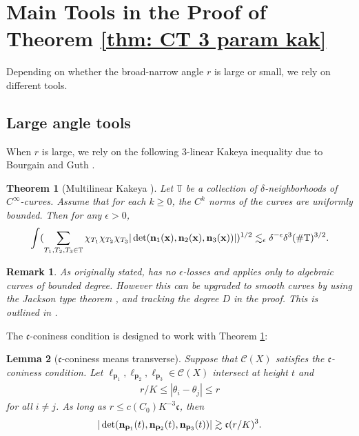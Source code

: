 \documentclass[12pt]{amsart}
\newcommand{\x}{{\bf{x}}}
\numberwithin{equation}{section}
\newtheorem{theorem}{Theorem}
\newtheorem{lemma}{Lemma}[section]
\newtheorem{remark}[lemma]{Remark}
\newcommand{\bn}{\mathbf{n}}
\renewcommand{\bn}{{\bf n}}
\newcommand{\1}{\mathbbm{1}}
\newcommand{\p}{\mathbf p}
\renewcommand{\x}{\mathbf x}
\begin{document}
\section{Main Tools in the Proof of Theorem \ref{thm: CT 3 param kak}}\label{sec: 4}

Depending on whether the broad-narrow angle $r$ is large or small, we rely on different tools. 

\subsection{Large angle tools}
When $r$ is large, we rely on the following 3-linear Kakeya inequality due to Bourgain and Guth \cite{BourgainGuth}.
\begin{theorem}[Multilinear Kakeya ]\label{thm: multilinear Kakeya}
    Let $\mathbb T$ be a collection of $\delta$-neighborhoods of $C^\infty$-curves. Assume that for each $k \geq 0$, the $C^k$ norms of the curves are uniformly bounded. Then for any $\epsilon > 0$, 
    \begin{align}\label{eq: multilinear Kakeya}
        \int (\sum_{T_1,T_2,T_3 \in \mathbb T} \chi_{T_1} \chi_{T_2} \chi_{T_3} |\det(\bn_1(\x),  \bn_2(\x), \bn_3(\x))|)^{1/2} \lesssim_\epsilon \delta^{-\epsilon} \delta^3 (\# \mathbb T)^{3/2}. 
    \end{align}
\end{theorem}

\begin{remark}
    As originally stated, \cite[Theorem 6]{BourgainGuth} has no $\epsilon$-losses and applies only to algebraic curves of bounded degree. However this can be upgraded to smooth curves by using the Jackson type theorem \cite[Theorem 2]{jacksonapprox}, and tracking the degree $D$ in the proof. This is outlined in \cite{BourgainGuth}.
\end{remark}
The $\mathfrak c$-coniness condition is designed to work with Theorem \ref{thm: multilinear Kakeya}: 
\begin{lemma}[$\mathfrak c$-coniness means transverse]\label{lem: coniness means transverse}
    Suppose that $\mathcal C(X)$ satisfies the $\mathfrak c$-coniness condition. Let $\ell_{\p_1},\ell_{\p_2},\ell_{\p_3} \in \mathcal C(X)$ intersect at height $t$ and
    \begin{align}
        r/K \leq |\theta_i - \theta_j| \leq r
    \end{align}
    for all $i \neq j$. As long as $r \leq c(C_0) K^{-3} \mathfrak c$, then 
    \begin{align}
        |\det(\bn_{\p_1}(t), \bn_{\p_2}(t), \bn_{\p_3}(t))| \gtrsim \mathfrak c (r/K)^3. 
    \end{align}
\end{lemma}
\end{document}
